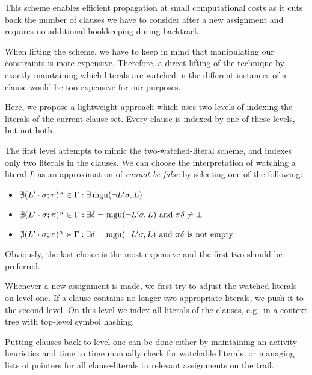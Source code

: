 \documentclass[a4paper]{article}
\begin{document}
This scheme enables efficient propagation at small computational costs as it cuts back the number of clauses we have to consider
after a new assignment and requires no additional bookkeeping during backtrack.

When lifting the scheme, we have to keep in mind that manipulating our constraints is more expensive.
Therefore, a direct lifting of the technique by exactly maintaining which literals are watched in the different instances of a clause would be 
too expensive for our purposes.

Here, we propose a lightweight approach which uses two levels of indexing the literals of the current clause set.
Every clause is indexed by one of these levels, but not both.

The first level attempts to mimic the two-watched-literal scheme, and indexes only two literals in the clauses. 
We can choose the interpretation of watching a literal $L$ as an approximation of \emph{cannot be false} by selecting one of the following:
\begin{itemize}
	\item $\nexists (L'\cdot\sigma; \pi)^\alpha \in \Gamma: \exists\operatorname{mgu}(\neg L'\sigma, L)$
	\item $\nexists (L'\cdot\sigma; \pi)^\alpha \in \Gamma: \exists\delta = \operatorname{mgu}(\neg L'\sigma, L)\text{ and } \pi\delta \ne \bot$
	\item $\nexists (L'\cdot\sigma; \pi)^\alpha \in \Gamma: \exists\delta = \operatorname{mgu}(\neg L'\sigma, L)\text{ and } \pi\delta \text{ is not empty}$
\end{itemize}
Obviously, the last choice is the most expensive and the first two should be preferred.

Whenever a new assignment is made, we first try to adjust the watched literals on level one. If a clause contains no longer two appropriate literals, we push it to the second level.
On this level we index all literals of the clauses, 
e.g.\ in a context tree with top-level symbol hashing. 

Putting clauses back to level one can be done either by maintaining an activity heuristics and time to time manually check for watchable literals, or managing lists of pointers for all clause-literals to relevant assignments 
on the trail.
\end{document}
